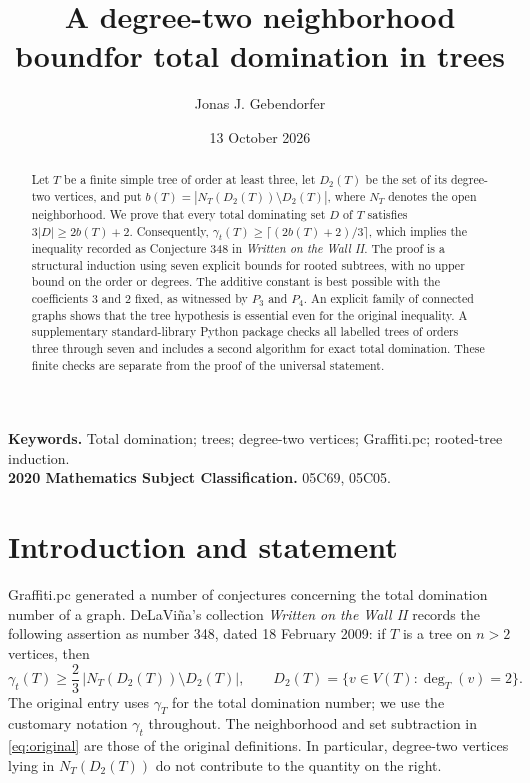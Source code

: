 \documentclass[11pt,a4paper]{article}
\title{A degree-two neighborhood bound\newline for total domination in trees}
\author{Jonas J. Gebendorfer}
\date{13 October 2026}
\theoremstyle{remark}
\newcommand{\td}{\gamma_t}
\begin{document}
\maketitle

\begin{abstract}
Let $T$ be a finite simple tree of order at least three, let $D_2(T)$ be
the set of its degree-two vertices, and put
$b(T)=|N_T(D_2(T))\setminus D_2(T)|$, where $N_T$ denotes the open
neighborhood. We prove that every total dominating set $D$ of $T$ satisfies
$3|D|\ge 2b(T)+2$. Consequently,
$\gamma_t(T)\ge\lceil(2b(T)+2)/3\rceil$, which implies the inequality
recorded as Conjecture 348 in \emph{Written on the Wall II}.
The proof is a structural induction using seven explicit bounds for
rooted subtrees, with no upper bound on the order or degrees.
The additive constant is best possible with the coefficients $3$ and $2$
fixed, as witnessed by $P_3$ and $P_4$. An explicit family of connected
graphs shows that the tree hypothesis is essential even for the original
inequality. A supplementary standard-library Python package checks all
labelled trees of orders three through seven and includes a second
algorithm for exact total domination. These finite checks are separate
from the proof of the universal statement.
\end{abstract}

\noindent\textbf{Keywords.} Total domination; trees; degree-two vertices;
Graffiti.pc; rooted-tree induction.\\
\textbf{2020 Mathematics Subject Classification.} 05C69, 05C05.

\section{Introduction and statement}
\label{sec:introduction}

Graffiti.pc generated a number of conjectures concerning the total
domination number of a graph. DeLaVi\~na's collection \emph{Written on
the Wall II} \cite{wowii} records the following assertion as number 348,
dated 18 February 2009: if $T$ is a tree on $n>2$ vertices, then
\begin{equation}\label{eq:original}
 \td(T)\ge\frac{2}{3}\,|N_T(D_2(T))\setminus D_2(T)|,
 \qquad D_2(T)=\{v\in V(T):\deg_T(v)=2\}.
\end{equation}
The original entry uses $\gamma_T$ for the total domination number;
we use the customary notation $\gamma_t$ throughout. The neighborhood
and set subtraction in \eqref{eq:original} are those of the original
definitions. In particular, degree-two vertices lying in
$N_T(D_2(T))$ do not contribute to the quantity on the right.
\end{document}
